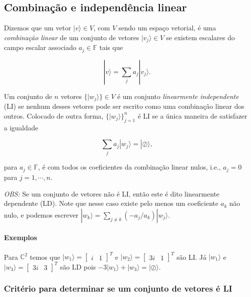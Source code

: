 \documentclass[11pt]{article}
\begin{document}
    \subsection{Combinação e independência
linear}\label{combinauxe7uxe3o-e-independuxeancia-linear}

Dizemos que um vetor \(|v\rangle\in V\), com \(V\) sendo um espaço
vetorial, é uma \emph{combinação linear} de um conjunto de vetores
\(|v_{j}\rangle\in V\) se existem escalares do campo escalar associado
\(a_{j}\in\mathbb{F}\) tais que

\begin{equation}
|v\rangle = \sum_{j}a_{j}|v_{j}\rangle.
\end{equation}

Um conjunto de \(n\) vetores \(\{|w_{j}\rangle\}\in V\) é um conjunto
\emph{linearmente independente} (LI) se nenhum desses vetores pode ser
escrito como uma combinação linear dos outros. Colocado de outra forma,
\(\{|w_{j}\rangle\}_{j=1}^{n}\) é LI se a única maneira de satisfazer a
igualdade

\begin{equation}
\sum_{j}a_{j}|w_{j}\rangle=|\oslash\rangle,
\end{equation}

para \(a_{j}\in\mathbb{F}\), é com todos os coeficientes da combinação
linear nulos, i.e., \(a_{j}=0\) para \(j=1,\cdots,n\).

\emph{OBS:} Se um conjunto de vetores não é LI, então este é dito
linearmente dependente (LD). Note que nesse caso existe pelo menos um
coeficiente \(a_{k}\) não nulo, e podemos escrever
\(|w_{k}\rangle=\sum_{j\ne k}(-a_{j}/a_{k})|w_{j}\rangle\).

\paragraph{Exemplos}\label{exemplos}

Para \(\mathbb{C}^{2}\) temos que
\(|w_{1}\rangle=\begin{bmatrix} i & 1 \end{bmatrix}^{T}\) e
\(|w_{2}\rangle=\begin{bmatrix} 3i & 1 \end{bmatrix}^{T}\) são LI. Já
\(|w_{1}\rangle\) e
\(|w_{3}\rangle=\begin{bmatrix} 3i & 3 \end{bmatrix}^{T}\) são LD pois
\(-3|w_{1}\rangle+|w_{3}\rangle=|\oslash\rangle\).

    \subsubsection{Critério para determinar se um conjunto de vetores é
LI}\label{crituxe9rio-para-determinar-se-um-conjunto-de-vetores-uxe9-li}
\end{document}
